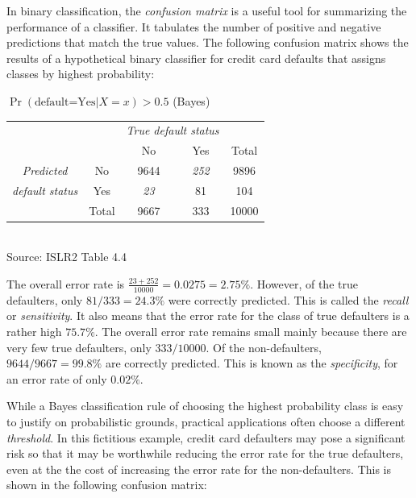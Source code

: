 In binary classification, the \emph{confusion matrix} is a useful tool for summarizing the performance of a classifier. It tabulates the number of positive and negative predictions that match the true values. The following confusion matrix shows the results of a hypothetical binary classifier for credit card defaults that assigns classes by highest probability:

\begin{center}
\renewcommand{\arraystretch}{1.25}

$\Pr(\text{default=Yes} | X=x) > 0.5$ (Bayes) \\ \vspace{2mm}
\begin{tabular}{cc|cc|c} \hline
     & & \multicolumn{2}{c|}{\emph{True default status}} \\
     & & No & Yes & Total \\ \hline
\emph{Predicted} & No & 9644 & \emph{252} & 9896 \\ 
\emph{default status} & Yes & \emph{23} & 81 & 104 \\ \hline
     & Total & 9667 & 333 & 10000 \\ \hline
\end{tabular} \\
\vspace{\baselineskip}
\scriptsize Source: ISLR2 Table 4.4 \normalsize \\
\end{center}

The overall error rate is $\frac{23 + 252}{10000} = 0.0275 = 2.75\%$. However, of the true defaulters, only $81/333 = 24.3\%$ were correctly predicted. This is called the \emph{recall} or \emph{sensitivity}. It also means that the error rate for the class of true defaulters is a rather high $75.7\%$. The overall error rate remains small mainly because there are very few true defaulters, only $333/10000$. Of the non-defaulters, $9644/9667=99.8\%$ are correctly predicted. This is known as the \emph{specificity}, for an error rate of only $0.02\%$.

While a Bayes classification rule of choosing the highest probability class is easy to justify on probabilistic grounds, practical applications often choose a different \emph{threshold}. In this fictitious example, credit card defaulters may pose a significant risk so that it may be worthwhile reducing the error rate for the true defaulters, even at the the cost of increasing the error rate for the non-defaulters. This is shown in the following confusion matrix:

